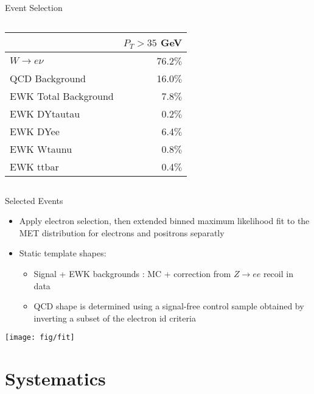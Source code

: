 \documentclass[t, 8pt]{beamer}
\begin{document}
\begin{frame}{Event Selection}
\begin{columns}[c]
{\begin{center}
    \begin{tabular}{|l|r|}
    \hline
    & $P_{T}>35$ GeV \\ \hline
    $W\to e\nu$  & 76.2$\%$\\\hline
    QCD Background       & 16.0$\%$\\\hline
    EWK Total Background & 7.8$\%$ \\
    EWK DYtautau         & 0.2$\%$  \\
    EWK DYee             & 6.4$\%$  \\
    EWK Wtaunu           & 0.8$\%$ \\
    EWK ttbar            & 0.4$\%$ \\\hline
    \end{tabular}
  \end{center}
  }

  \end{columns}
\end{frame}

\begin{frame}{Selected Events}
  \begin{itemize}
    \item Apply electron selection, then extended binned maximum likelihood fit to the MET distribution for electrons and positrons separatly
    \item Static template shapes:
    \begin{itemize}
      \item Signal + EWK backgrounds : MC + correction from $Z \to ee$ recoil in data 
      \item QCD shape is determined using a signal-free control sample obtained by inverting a subset of the electron id criteria
    \end{itemize}
  \end{itemize}
    \begin{center}
      \texttt{[image: fig/fit]}
    \end{center}
\end{frame}

\section{Systematics}
\end{document}
